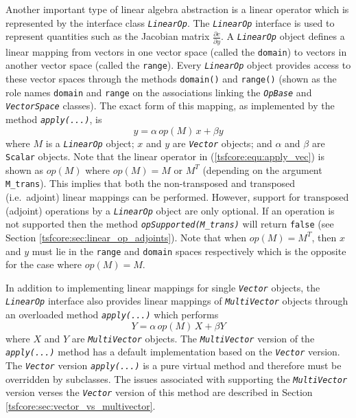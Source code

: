 Another important type of linear algebra abstraction is a linear
operator which is represented by the interface class
\texttt{\textit{LinearOp}}.  The \texttt{\textit{LinearOp}} interface
is used to represent quantities such as the Jacobian matrix
$\frac{\partial c}{\partial y}$. A \texttt{\textit{LinearOp}} object
defines a linear mapping from vectors in one vector space (called the
\texttt{domain}) to vectors in another vector space (called the
\texttt{range}).  Every \texttt{\textit{LinearOp}} object provides
access to these vector spaces through the methods \texttt{domain()} and
\texttt{range()} (shown as the role names \texttt{domain} and
\texttt{range} on the associations linking the
\texttt{\textit{OpBase}} and \texttt{\textit{VectorSpace}} classes).
The exact form of this mapping, as implemented by the
method \texttt{\textit{apply(\-...)}}, is
%
\begin{equation}
y = \alpha \, op(M) \, x + \beta y
\label{tsfcore:equ:apply_vec}
\end{equation}
%
where $M$ is a \texttt{\textit{LinearOp}} object; $x$ and $y$ are
\texttt{\textit{Vector}} objects; and $\alpha$ and $\beta$ are \texttt{Scalar}
objects.  Note that the linear operator in (\ref{tsfcore:equ:apply_vec})
is shown as $op(M)$ where $op(M) = M$ or $M^T$ (depending on the
argument \texttt{M\_trans}). This implies that both the non-transposed
and transposed (i.e.~adjoint) linear mappings can be performed.
However, support for transposed (adjoint) operations by a
\texttt{\textit{LinearOp}} object are only optional.  If an operation is
not supported then the method \texttt{\textit{opSupported(M\_trans)}}
will return \texttt{false} (see Section
\ref{tsfcore:sec:linear_op_adjoints}).  Note that when $op(M) = M^T$,
then $x$ and $y$ must lie in the \texttt{range} and
\texttt{domain} spaces respectively which is the opposite for the case
where $op(M) = M$.

In addition to implementing linear mappings for single
\texttt{\textit{Vector}} objects, the
\texttt{\textit{LinearOp}} interface also provides linear mappings of
\texttt{\textit{Multi\-Vector}} objects through an overloaded method
\texttt{\textit{apply(\-...)}} which performs
%
\begin{equation}
Y = \alpha \, op(M) \, X + \beta Y
\label{tsfcore:equ:apply_multi_vec}
\end{equation}
%
where $X$ and $Y$ are \texttt{\textit{Multi\-Vector}} objects.  The
\texttt{\textit{Multi\-Vector}} version of the \texttt{\textit{apply(\-...)}} method has a
default implementation based on the \texttt{\textit{Vector}} version.
The \texttt{\textit{Vector}} version
\texttt{\textit{apply(\-...)}}  is a pure virtual method and therefore must be
overridden by subclasses.  The issues associated with supporting the
\texttt{\textit{Multi\-Vector}} version verses the \texttt{\textit{Vector}}
version of this method are described in Section
\ref{tsfcore:sec:vector_vs_multivector}.

